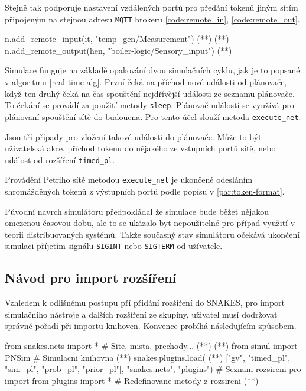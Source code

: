 Stejně tak podporuje nastavení vzdálených portů pro předání tokenů jiným sítím připojeným na stejnou adresu \texttt{MQTT} brokeru \ref{code:remote_in}, \ref{code:remote_out}.

\begin{python}
 n.add_remote_input(it, "temp_gen/Measurement") (*\label{code:remote_in}*) (*\label{code:remote-in-out}*)
 n.add_remote_output(hen, "boiler-logic/Sensory_input") (*\label{code:remote_out}*)
\end{python}

Simulace funguje na základě opakování dvou simulačních cyklu, jak je to popsané v algoritmu \ref{real-time-alg}. První čeká na příchod nové události od plánovače, když ten druhý čeká na čas spouštění nejdřívější události ze seznamu plánovače. To čekání se provádí za použití metody \texttt{sleep}. Plánovač událostí se využívá pro plánovaní spouštění sítě do budoucna. Pro tento účel slouží metoda \texttt{execute\_net}.

Jsou tří případy pro vložení takové události do plánovače. Může to být uživatelská akce, příchod tokenu do nějakého ze vstupních portů sítě, nebo událost od rozšíření \texttt{timed\_pl}.

Provádění Petriho sítě metodou \texttt{execute\_net} je ukončené odesláním shromážděných tokenů z výstupních portů podle popísu v \ref{par:token-format}.

Původní navrch simulátoru předpokládal že simulace bude běžet nějakou omezenou časovou dobu, ale to se ukázalo byt nepoužitelné pro případ využití v teorii distribuovaných systémů. Takže současný stav simulátoru očekává ukončení simulaci příjetím signálu \texttt{SIGINT} nebo \texttt{SIGTERM} od užívatele.

\subsection{Návod pro import rozšíření}
Vzhledem k odlišnému postupu pří přidání rozšíření do SNAKES, pro import simulačního nástroje a dalších rozšíření ze skupiny, uživatel musí dodržovat správné pořadí při importu knihoven. Konvence probíhá následujícím způsobem.

\begin{python}
 from snakes.nets import *   # Site, mista, prechody... (*\label{code:snakes-all}*) (*\label{code:plugin-setup}*)
 from simul import PNSim     # Simulacni knihovna (*\label{code:pnsim}*)
 snakes.plugins.load( (*\label{code:sim-plugins}*)
   ["gv", "timed_pl", "sim_pl", "prob_pl", "prior_pl"],
   "snakes.nets",
   "plugins") # Seznam rozsireni pro import
 from plugins import * # Redefinovane metody z rozsireni (*\label{code:pl-import}*)
\end{python}

